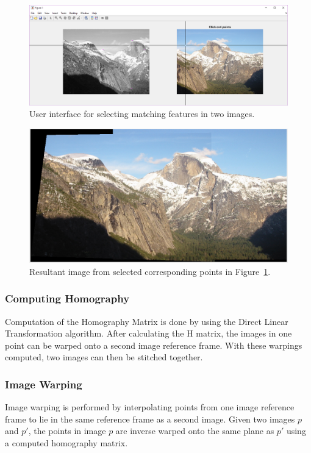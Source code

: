 \documentclass[12pt,journal,compsoc]{IEEEtran}
\begin{document}
\begin{figure}[h]
	\centering
		  \centering
		  \includegraphics[width=1\linewidth]{img/click1}
		  \caption{User interface for selecting matching features in two images.}
		  \label{fig:click1}
\end{figure}

\begin{figure}[h]
	\centering
		  \centering
		  \includegraphics[width=1\linewidth]{img/click2}
		  \caption{Resultant image from selected corresponding points in Figure~\ref{fig:click1}.}
		  \label{fig:click2}
\end{figure}

\subsubsection{Computing Homography}
Computation of the Homography Matrix is done by using the Direct Linear Transformation algorithm.
After calculating the H matrix, the images in one point can be warped onto a second image reference frame. With these warpings computed, two images can then be stitched together.

\subsubsection{Image Warping}
Image warping is performed by interpolating points from one image reference frame to lie in the same reference frame as a second image. Given two images $p$ and $p'$, the points in image $p$ are inverse warped onto the same plane as $p'$ using a computed homography matrix.
\end{document}
